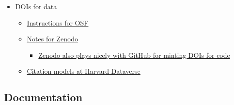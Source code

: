 \documentclass[
]{article}
\providecommand{\tightlist}{%
  \setlength{\itemsep}{0pt}\setlength{\parskip}{0pt}}
\begin{document}
\begin{itemize}
  \begin{itemize}
  \tightlist
  \item
    R1. meta(data) are richly described with a plurality of accurate and relevant attributes

    \begin{itemize}
    \tightlist
    \item
      R1.1. (meta)data are released with a clear and accessible data usage license
    \item
      R1.2. (meta)data are associated with detailed provenance
    \item
      R1.3. (meta)data meet domain-relevant community standards
    \end{itemize}
  \end{itemize}
\item
  DOIs for data

  \begin{itemize}
  \tightlist
  \item
    \href{https://help.osf.io/hc/en-us/articles/360019931013-Create-DOIs}{Instructions for OSF}
  \item
    \href{https://help.zenodo.org/\#versioning}{Notes for Zenodo}

    \begin{itemize}
    \tightlist
    \item
      \href{https://guides.github.com/activities/citable-code/}{Zenodo also plays nicely with GitHub for minting DOIs for code}
    \end{itemize}
  \item
    \href{https://dataverse.org/best-practices/data-citation}{Citation models at Harvard Dataverse}
  \end{itemize}
\end{itemize}

\hypertarget{documentation}{%
\subsection{Documentation}\label{documentation}}
\end{document}
